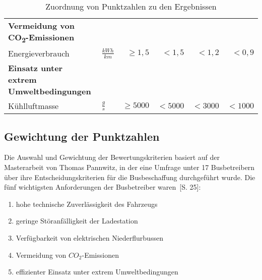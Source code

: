 \begin{table}
\begin{tabulary}{\linewidth}{LLrrrr}
		\textbf{Vermeidung von CO\textsubscript{2}-Emissionen}   &                  &            &         &           &  \\
		Energieverbrauch                                         & $\frac{kWh}{km}$ &  $\ge 1,5$ &  $<1,5$ &    $<1,2$ &       $<0,9$ \\ \midrule
		\textbf{Einsatz unter extrem Umweltbedingungen}          &                  &            &         &           &  \\
		Kühlluftmasse                                            & $\frac{g}{s}$     & $\ge 5000$ & $<5000$ &   $<3000$ &      $<1000$ \\ \bottomrule
	\end{tabulary}
	\caption{Zuordnung von Punktzahlen zu den Ergebnissen}
	\label{tab_punktzahlen}
\end{table} 

\subsection{Gewichtung der Punktzahlen}
Die Auswahl und Gewichtung der Bewertungskriterien basiert auf der Masterarbeit von Thomas Pannwitz, in der eine Umfrage unter 17 Busbetreibern über ihre Entscheidungskriterien für die Busbeschaffung durchgeführt wurde. Die fünf wichtigsten Anforderungen der Busbetreiber waren~\cite{pannwitz2014}[S. 25]:
\begin{enumerate}
	\item hohe technische Zuverlässigkeit des Fahrzeugs
	\item geringe Störanfälligkeit der Ladestation
	\item Verfügbarkeit von elektrischen Niederflurbussen
	\item Vermeidung von $CO_2$-Emissionen
	\item effizienter Einsatz unter extrem Umweltbedingungen
\end{enumerate}


